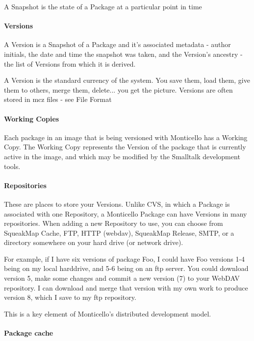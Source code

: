 \documentclass[a4paper,10pt,twoside]{book}
\begin{document}
A Snapshot is the state of a Package at a particular point in time

\paragraph{Versions}

A Version is a Snapshot of a Package and it's associated metadata - author initials, the date and time the snapshot was taken, and the Version's ancestry - the list of Versions from which it is derived.

A Version is the standard currency of the system. You save them, load them, give them to others, merge them, delete... you get the picture. Versions are often stored in mcz files - see File Format

\paragraph{Working Copies}

Each package in an image that is being versioned with Monticello has a Working Copy. The Working Copy represents the Version of the package that is currently active in the image, and which may be modified by the Smalltalk development tools.

\paragraph{Repositories}

These are places to store your Versions. Unlike CVS, in which a Package is associated with one Repository, a Monticello Package can have Versions in many repositories. When adding a new Repository to use, you can choose from SqueakMap Cache, FTP, HTTP (webdav), SqueakMap Release, SMTP, or a directory somewhere on your hard drive (or network drive).

For example, if I have six versions of package Foo, I could have Foo versions 1-4 being on my local harddrive, and 5-6 being on an ftp server. You could download version 5, make some changes and commit a new version (7) to your WebDAV repository. I can download and merge that version with my own work to produce version 8, which I save to my ftp repository.

This is a key element of Monticello's distributed development model.

\paragraph{Package cache}
\end{document}
